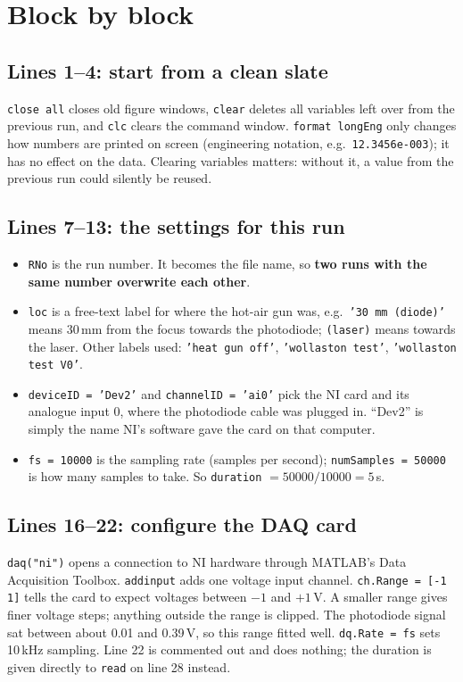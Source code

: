 \documentclass[11pt,a4paper]{article}
\newcommand{\code}[1]{\texttt{#1}}
\begin{document}
\section{Block by block}

\subsection*{Lines 1--4: start from a clean slate}
\code{close all} closes old figure windows, \code{clear} deletes all variables left over from the
previous run, and \code{clc} clears the command window. \code{format longEng} only changes how
numbers are printed on screen (engineering notation, e.g.\ \code{12.3456e-003}); it has no effect
on the data. Clearing variables matters: without it, a value from the previous run could silently
be reused.

\subsection*{Lines 7--13: the settings for this run}
\begin{itemize}
\item \code{RNo} is the run number. It becomes the file name, so \textbf{two runs with the same
  number overwrite each other}.
\item \code{loc} is a free-text label for where the hot-air gun was, e.g.\ \code{'30 mm (diode)'}
  means 30\,mm from the focus towards the photodiode; \code{(laser)} means towards the laser.
  Other labels used: \code{'heat gun off'}, \code{'wollaston test'}, \code{'wollaston test V0'}.
\item \code{deviceID = 'Dev2'} and \code{channelID = 'ai0'} pick the NI card and its analogue
  input 0, where the photodiode cable was plugged in. ``Dev2'' is simply the name NI's software
  gave the card on that computer.
\item \code{fs = 10000} is the sampling rate (samples per second); \code{numSamples = 50000} is
  how many samples to take. So \code{duration} $= 50000/10000 = 5$\,s.
\end{itemize}

\subsection*{Lines 16--22: configure the DAQ card}
\code{daq("ni")} opens a connection to NI hardware through MATLAB's Data Acquisition Toolbox.
\code{addinput} adds one voltage input channel. \code{ch.Range = [-1 1]} tells the card to expect
voltages between $-1$ and $+1$\,V. A smaller range gives finer voltage steps; anything outside the
range is clipped. The photodiode signal sat between about 0.01 and 0.39\,V, so this range fitted
well. \code{dq.Rate = fs} sets 10\,kHz sampling. Line 22 is commented out and does nothing; the
duration is given directly to \code{read} on line 28 instead.
\end{document}
